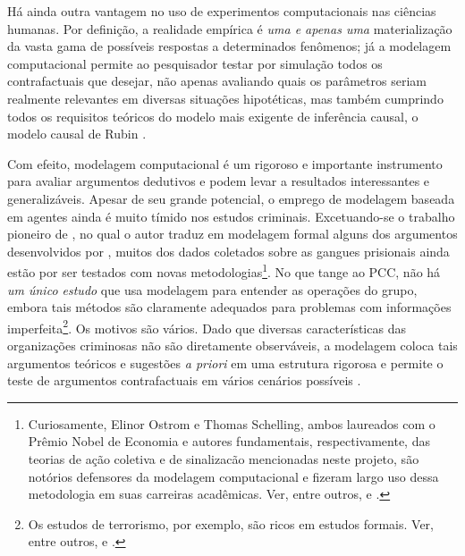 \documentclass[a4paper,11pt]{article}
\begin{document}
Há ainda outra vantagem no uso de experimentos computacionais nas ciências humanas. Por definição, a realidade empírica é \textit{uma e apenas uma} materialização da vasta gama de possíveis respostas a determinados fenômenos; já a modelagem computacional permite ao pesquisador testar por simulação todos os contrafactuais que desejar, não apenas avaliando quais os parâmetros seriam realmente relevantes em diversas situações hipotéticas, mas também cumprindo todos os requisitos teóricos do modelo mais exigente de inferência causal, o modelo causal de Rubin \citep{holland1986statistics, imbens2009causal, morgan2007counterfactuals, rubin2005causal}. 

Com efeito, modelagem computacional é um rigoroso e importante instrumento para avaliar argumentos dedutivos e podem levar a resultados interessantes e generalizáveis. Apesar de seu grande potencial, o emprego de modelagem baseada em agentes ainda é muito tímido nos estudos criminais. Excetuando-se o trabalho pioneiro de \citet{dixit2011game}, no qual o autor traduz em modelagem formal alguns dos argumentos desenvolvidos por \cite{gambetta2009codes}, muitos dos dados coletados sobre as gangues prisionais ainda estão por ser testados com novas metodologias\footnote{Curiosamente, Elinor Ostrom e Thomas Schelling, ambos laureados com o Prêmio Nobel de Economia e autores fundamentais, respectivamente, das teorias de ação coletiva e de sinalizacão mencionadas neste projeto, são notórios defensores da modelagem computacional e fizeram largo uso dessa metodologia em suas carreiras acadêmicas. Ver, entre outros, \citet{janssen2006empirically} e \citet[xi]{schelling2006strategies}.}. No que tange ao PCC, não há \textit{um único estudo} que usa modelagem para entender as operações do grupo, embora tais métodos são claramente adequados para problemas com informações imperfeita\footnote{Os estudos de terrorismo, por exemplo, são ricos em estudos formais. Ver, entre outros, \citet{de2005quality} e \citet{fricker2006game}.}. Os motivos são vários. Dado que diversas características das organizações criminosas não são diretamente observáveis, a modelagem coloca tais argumentos teóricos e sugestões \textit{a priori} em uma estrutura rigorosa e permite o teste de argumentos contrafactuais em vários cenários possíveis \citep{baldassarri2009collective}. 
\end{document}
